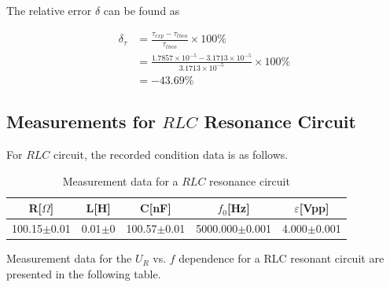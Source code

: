 \documentclass[a4paper]{article}
\begin{document}
The relative error $\delta$ can be found as

\begin{align*}
	\delta_{\tau}
	 & = \frac{\tau_{exp}-\tau_{theo}}{\tau_{theo}}\times 100\%                             \\
	 & = \frac{1.7857\times 10^{-5}-3.1713\times 10^{-5}}{3.1713\times 10^{-5}}\times 100\% \\
	 & = -43.69\%
\end{align*}

\subsection{Measurements for $RLC$ Resonance Circuit}

For $RLC$ circuit, the recorded condition data is as follows.
\begin{table}[!htbp]
	\centering
	\begin{tabular}{ccccc}
		\hline
		R[$\Omega$]     & L[H]       & C[nF]           & $f_0$[Hz]          & $\varepsilon$[Vpp] \\
		\hline
		100.15$\pm$0.01 & 0.01$\pm$0 & 100.57$\pm$0.01 & 5000.000$\pm$0.001 & 4.000$\pm$0.001    \\
		\hline
	\end{tabular}%
	\caption{Measurement data for a $RLC$ resonance circuit}
\end{table}

Measurement data for the $U_R$ vs. $f$ dependence for a RLC resonant circuit are presented in the following table.
\end{document}
